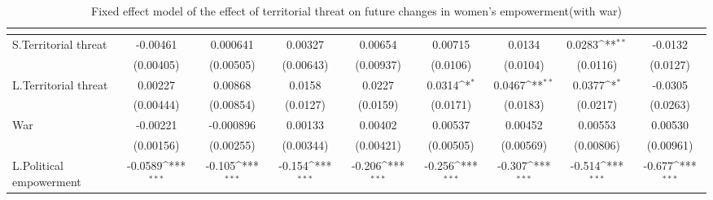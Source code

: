 \begin{table}[htbp]\centering
\def\sym#1{\ifmmode^{#1}\else\(^{#1}\)\fi}
\caption{Fixed effect model of the effect of territorial threat on future changes in women's empowerment(with war) \label{fepolempwar}}
\begin{tabular}{l*{8}{c}}
\hline\hline
                    &&&&&&&&\\
\hline
S.Territorial threat&    -0.00461         &    0.000641         &     0.00327         &     0.00654         &     0.00715         &      0.0134         &      0.0283\sym{**} &     -0.0132         \\
                    &   (0.00405)         &   (0.00505)         &   (0.00643)         &   (0.00937)         &    (0.0106)         &    (0.0104)         &    (0.0116)         &    (0.0127)         \\
[1em]
L.Territorial threat&     0.00227         &     0.00868         &      0.0158         &      0.0227         &      0.0314\sym{*}  &      0.0467\sym{**} &      0.0377\sym{*}  &     -0.0305         \\
                    &   (0.00444)         &   (0.00854)         &    (0.0127)         &    (0.0159)         &    (0.0171)         &    (0.0183)         &    (0.0217)         &    (0.0263)         \\
[1em]
War                 &    -0.00221         &   -0.000896         &     0.00133         &     0.00402         &     0.00537         &     0.00452         &     0.00553         &     0.00530         \\
                    &   (0.00156)         &   (0.00255)         &   (0.00344)         &   (0.00421)         &   (0.00505)         &   (0.00569)         &   (0.00806)         &   (0.00961)         \\
[1em]
L.Political empowerment&     -0.0589\sym{***}&      -0.105\sym{***}&      -0.154\sym{***}&      -0.206\sym{***}&      -0.256\sym{***}&      -0.307\sym{***}&      -0.514\sym{***}&      -0.677\sym{***}\\

\end{tabular}
\end{table}

